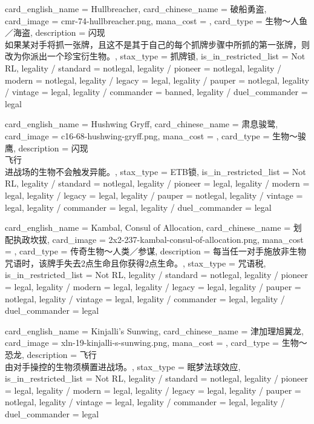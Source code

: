 \documentclass[lang = cn, color = black, 10pt]{AllThatStax}
\begin{document}
\card
{
	card_english_name = {Hullbreacher},
	card_chinese_name = {破船勇盗},
	card_image = cmr-74-hullbreacher.png,
	mana_cost = ,
	card_type = 生物～人鱼／海盗,
	description = {闪现\\
如果某对手将抓一张牌，且这不是其于自己的每个抓牌步骤中所抓的第一张牌，则改为你派出一个珍宝衍生物。},
	stax_type = 抓牌锁,
	is_in_restricted_list = Not RL,
	legality / standard = notlegal,
	legality / pioneer = notlegal,
	legality / modern = notlegal,
	legality / legacy = legal,
	legality / pauper = notlegal,
	legality / vintage = legal,
	legality / commander = banned,
	legality / duel_commander = legal
}

\card
{
	card_english_name = {Hushwing Gryff},
	card_chinese_name = {肃息骏鹭},
	card_image = c16-68-hushwing-gryff.png,
	mana_cost = ,
	card_type = 生物～骏鹰,
	description = {闪现\\
飞行\\
进战场的生物不会触发异能。},
	stax_type = ETB锁,
	is_in_restricted_list = Not RL,
	legality / standard = notlegal,
	legality / pioneer = legal,
	legality / modern = legal,
	legality / legacy = legal,
	legality / pauper = notlegal,
	legality / vintage = legal,
	legality / commander = legal,
	legality / duel_commander = legal
}

\card
{
	card_english_name = {Kambal, Consul of Allocation},
	card_chinese_name = {划配执政坎拔},
	card_image = 2x2-237-kambal-consul-of-allocation.png,
	mana_cost = ,
	card_type = 传奇生物～人类／参谋,
	description = {每当任一对手施放非生物咒语时，该牌手失去2点生命且你获得2点生命。},
	stax_type = 咒语税,
	is_in_restricted_list = Not RL,
	legality / standard = notlegal,
	legality / pioneer = legal,
	legality / modern = legal,
	legality / legacy = legal,
	legality / pauper = notlegal,
	legality / vintage = legal,
	legality / commander = legal,
	legality / duel_commander = legal
}

\card
{
	card_english_name = {Kinjalli's Sunwing},
	card_chinese_name = {津加理旭翼龙},
	card_image = xln-19-kinjalli-s-sunwing.png,
	mana_cost = ,
	card_type = 生物～恐龙,
	description = {飞行\\
由对手操控的生物须横置进战场。},
	stax_type = 眠梦法球效应,
	is_in_restricted_list = Not RL,
	legality / standard = notlegal,
	legality / pioneer = legal,
	legality / modern = legal,
	legality / legacy = legal,
	legality / pauper = notlegal,
	legality / vintage = legal,
	legality / commander = legal,
	legality / duel_commander = legal
}
\end{document}
